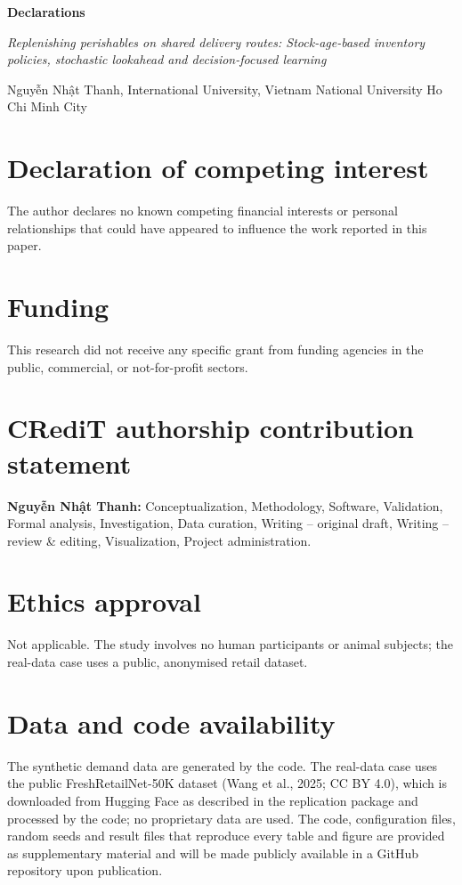 \documentclass[11pt,a4paper]{article}
\begin{document}
\begin{center}
{\Large\bfseries Declarations\par}
\vspace{0.6em}
{\itshape Replenishing perishables on shared delivery routes: Stock-age-based inventory policies, stochastic lookahead and decision-focused learning\par}
\vspace{0.4em}
Nguyễn Nhật Thanh, International University, Vietnam National University Ho Chi Minh City
\end{center}

\section*{Declaration of competing interest}
The author declares no known competing financial interests or personal relationships that could have appeared to influence the work reported in this paper.

\section*{Funding}
This research did not receive any specific grant from funding agencies in the public, commercial, or not-for-profit sectors.

\section*{CRediT authorship contribution statement}
\textbf{Nguyễn Nhật Thanh:} Conceptualization, Methodology, Software, Validation, Formal analysis, Investigation, Data curation, Writing -- original draft, Writing -- review \& editing, Visualization, Project administration.

\section*{Ethics approval}
Not applicable. The study involves no human participants or animal subjects; the real-data case uses a public, anonymised retail dataset.

\section*{Data and code availability}
The synthetic demand data are generated by the code. The real-data case uses the public FreshRetailNet-50K dataset (Wang et al., 2025; CC BY 4.0), which is downloaded from Hugging Face as described in the replication package and processed by the code; no proprietary data are used. The code, configuration files, random seeds and result files that reproduce every table and figure are provided as supplementary material and will be made publicly available in a GitHub repository upon publication.
\end{document}
